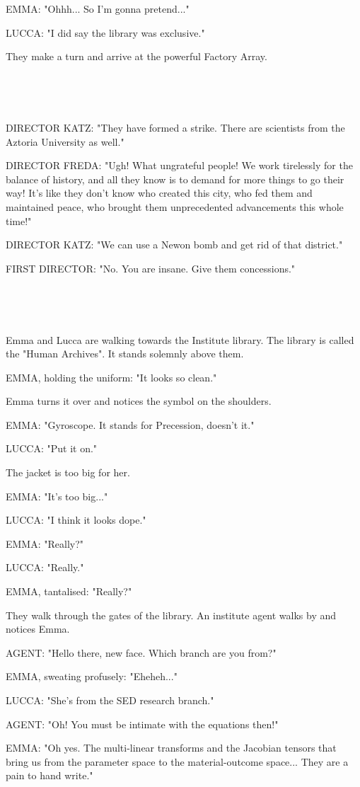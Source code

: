 \documentclass[11pt]{article}
\begin{document}
EMMA: "Ohhh... So I'm gonna pretend..."

LUCCA: "I did say the library was exclusive."

They make a turn and arrive at the powerful Factory Array.

\ 

\ 

DIRECTOR KATZ: "They have formed a strike.
There are scientists from the Aztoria University as well."

DIRECTOR FREDA: "Ugh! What ungrateful people! 
We work tirelessly for the balance of history, and all they know is to demand for more things to go their way!
It's like they don't know who created this city, who fed them and maintained peace, who brought them unprecedented advancements this whole time!"

DIRECTOR KATZ: "We can use a Newon bomb and get rid of that district."

FIRST DIRECTOR: "No. You are insane.
Give them concessions."

\ 

\ 

Emma and Lucca are walking towards the Institute library.
The library is called the "Human Archives".
It stands solemnly above them.

EMMA, holding the uniform: "It looks so clean."

Emma turns it over and notices the symbol on the shoulders.

EMMA: "Gyroscope. It stands for Precession, doesn't it."

LUCCA: "Put it on."

The jacket is too big for her.

EMMA: "It's too big..."

LUCCA: "I think it looks dope."

EMMA: "Really?"

LUCCA: "Really."

EMMA, tantalised: "Really?"

They walk through the gates of the library.
An institute agent walks by and notices Emma.

AGENT: "Hello there, new face. Which branch are you from?"

EMMA, sweating profusely: "Eheheh..."

LUCCA: "She's from the SED research branch."

AGENT: "Oh! You must be intimate with the equations then!"

EMMA: "Oh yes. 
The multi-linear transforms and the Jacobian tensors that bring us from the parameter space to the material-outcome space...
They are a pain to hand write."
\end{document}
